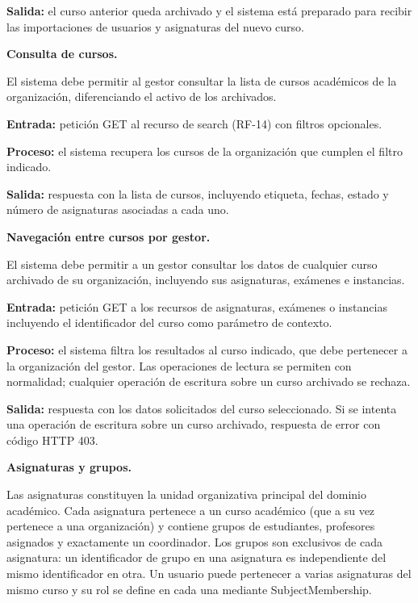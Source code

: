 \begin{functional}
\begin{functional}
    \textbf{Salida:} el curso anterior queda archivado y el sistema está preparado para recibir las importaciones de usuarios y asignaturas del nuevo curso.

    \item \textbf{Consulta de cursos.}

    El sistema debe permitir al gestor consultar la lista de cursos académicos de la organización, diferenciando el activo de los archivados.

    \textbf{Entrada:} petición GET al recurso de search (RF-14) con filtros opcionales.

    \textbf{Proceso:} el sistema recupera los cursos de la organización que cumplen el filtro indicado.

    \textbf{Salida:} respuesta con la lista de cursos, incluyendo etiqueta, fechas, estado y número de asignaturas asociadas a cada uno.

    \item \textbf{Navegación entre cursos por gestor.}

    El sistema debe permitir a un gestor consultar los datos de cualquier curso archivado de su organización, incluyendo sus asignaturas, exámenes e instancias.

    \textbf{Entrada:} petición GET a los recursos de asignaturas, exámenes o instancias incluyendo el identificador del curso como parámetro de contexto.

    \textbf{Proceso:} el sistema filtra los resultados al curso indicado, que debe pertenecer a la organización del gestor. Las operaciones de lectura se permiten con normalidad; cualquier operación de escritura sobre un curso archivado se rechaza.

    \textbf{Salida:} respuesta con los datos solicitados del curso seleccionado. Si se intenta una operación de escritura sobre un curso archivado, respuesta de error con código HTTP 403.

  \end{functional}

  \item \textbf{Asignaturas y grupos.}

  Las asignaturas constituyen la unidad organizativa principal del dominio académico. Cada asignatura pertenece a un curso académico (que a su vez pertenece a una organización) y contiene grupos de estudiantes, profesores asignados y exactamente un coordinador. Los grupos son exclusivos de cada asignatura: un identificador de grupo en una asignatura es independiente del mismo identificador en otra. Un usuario puede pertenecer a varias asignaturas del mismo curso y su rol se define en cada una mediante SubjectMembership.


\end{functional}
